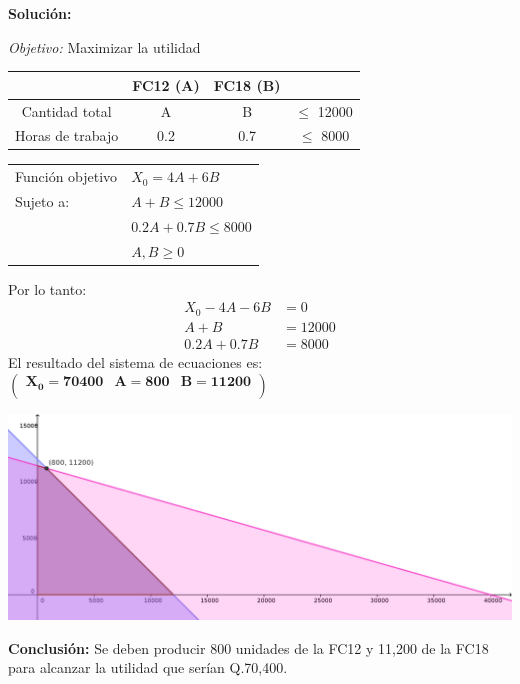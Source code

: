 \documentclass[11pt]{article}
\newcommand\solucion{\vspace{.10in}\textbf{Solución: }}
\newcommand\conclusion{\vspace{.10in}\textbf{Conclusión: }}
\newcommand\obj{\vspace{.10in}\textit{Objetivo: }}
\begin{document}
\solucion

\obj Maximizar la utilidad

\begin{tabular}{|c|c|c|c|}
\hline 
 & FC12 (A) & FC18 (B) &  \\ 
\hline 
Cantidad total & A & B & $\leq$ 12000 \\ 
\hline 
Horas de trabajo & 0.2 & 0.7 & $\leq$ 8000 \\ 
\hline 
\end{tabular}

\begin{table}[h]
\begin{tabular}{ll}
Función objetivo & $X_0 = 4A+6B$    \\
Sujeto a:        & $A+B \leq 12000$ \\
                 & $0.2A+0.7B \leq 8000$ \\
                 & $A,B \geq 0$    
\end{tabular}
\end{table}

Por lo tanto:
\begin{align*}
X_0-4A-6B &= 0\\
A+B &= 12000\\
0.2A+0.7B &= 8000
\end{align*}
El resultado del sistema de ecuaciones es:
\begin{math}
\mathbf{\left(\begin{array}{rrr}X_0=70400&A=800&B=11200\\\end{array}\right)}
\end{math}

\begin{center}
\includegraphics[scale=0.3]{parcial1src/problema5.png}
\end{center}
\conclusion Se deben producir 800 unidades de la FC12 y 11,200 de la FC18 para alcanzar la utilidad que serían Q.70,400.
\end{document}
